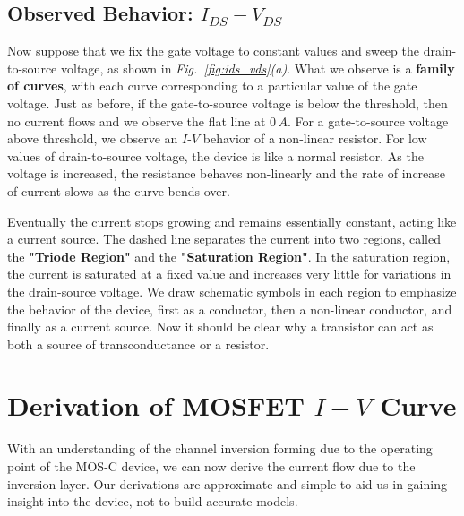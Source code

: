 \subsection{Observed Behavior: \texorpdfstring{$I_{DS} - V_{DS}$}{Drain Current vs. Drain Voltage}}
Now suppose that we fix the gate voltage to constant values and sweep the drain-to-source voltage, as shown in \emph{Fig.~\ref{fig:ids_vds}(a)}.  What we observe is a \textbf{family of curves}, with each curve corresponding to a particular value of the gate voltage.  Just as before, if the gate-to-source voltage is below the threshold, then no current flows and we observe the flat line at $0\,A$. For a gate-to-source voltage above threshold, we observe an $I$-$V$ behavior of a non-linear resistor.  For low values of drain-to-source voltage, the device is like a normal resistor. As the voltage is increased, the resistance behaves non-linearly and the rate of increase of current slows as the curve bends over.

Eventually the current stops growing and remains essentially constant, acting like a current source.  The dashed line separates the current into two regions, called the \textbf{"Triode Region"} and the \textbf{"Saturation Region"}.  In the saturation region, the current is saturated at a fixed value and increases very little for variations in the drain-source voltage.  We draw schematic symbols in each region to emphasize the behavior of the device, first as a conductor, then a non-linear conductor, and finally as a current source.  Now it should be clear why a transistor can act as both a source of transconductance or a resistor.
\section{Derivation of MOSFET \texorpdfstring{$I-V$}{I-V} Curve}
With an understanding of the channel inversion forming due to the operating point of the MOS-C device, we can now derive the current flow due to the inversion layer.  Our derivations are approximate and simple to aid us in gaining insight into the device, not to build accurate models.
